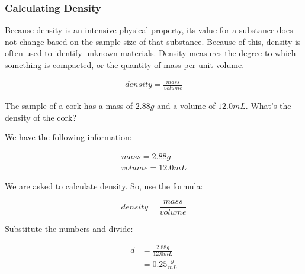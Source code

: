 \subsubsection*{Calculating Density}

Because density is an intensive physical property, its value for a substance
does not change based on the sample size of that substance. Because of this,
density is often used to identify unknown materials. Density measures the
degree to which something is compacted, or the quantity of mass per unit
volume.

\begin{align}
    density = \frac{mass}{volume}
\end{align}

\begin{example}
    The sample of a cork has a mass of $2.88 g$ and a volume of $12.0 mL$. What's the density of the cork?

    We have the following information:

    \begin{align}
        mass = 2.88 g \\
        volume = 12.0 mL
    \end{align}

    We are asked to calculate density. So, use the formula:

    \[ density = \frac{mass}{volume} \]

    Substitute the numbers and divide:

    \begin{align}
        d &= \frac{2.88 g}{12.0 mL} \\
          &= 0.25 \frac{g}{mL}
  \end{align}
\end{example}

